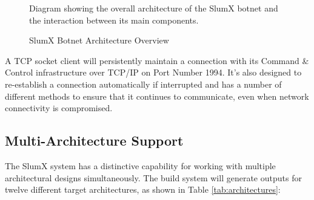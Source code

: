 \documentclass[12pt,letterpaper]{report}
\begin{document}
\begin{figure}[H]
\caption{SlumX Botnet Architecture Overview}
\begin{center}\small Diagram showing the overall architecture of the SlumX botnet and the interaction between its main components.\end{center}
\label{fig:architecture}
\end{figure}

A TCP socket client will persistently maintain a connection with its Command \& Control infrastructure over TCP/IP on Port Number 1994. It's also designed to re-establish a connection automatically if interrupted and has a number of different methods to ensure that it continues to communicate, even when network connectivity is compromised.
\subsection{Multi-Architecture Support}

The SlumX system has a distinctive capability for working with multiple architectural designs simultaneously. The build system will generate outputs for twelve different target architectures, as shown in Table \ref{tab:architectures}:
\end{document}
